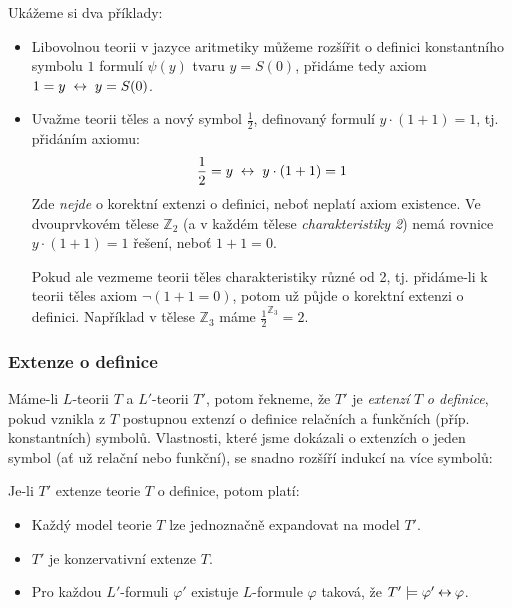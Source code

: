 \begin{example}
    Ukážeme si dva příklady:
    \begin{itemize}
        \item Libovolnou teorii v jazyce aritmetiky můžeme rozšířit o definici konstantního symbolu $1$ formulí $\psi(y)$ tvaru $y=S(0)$, přidáme tedy axiom $1=y\ \liff\ y=S(0)$.
        \item Uvažme teorii těles a nový symbol $\frac{1}{2}$, definovaný formulí $y\cdot (1+1)=1$, tj. přidáním axiomu: 
        $$
        \frac{1}{2}=y\ \liff\ y\cdot (1+1)=1
        $$
        Zde \emph{nejde} o korektní extenzi o definici, neboť neplatí axiom existence. Ve dvouprvkovém tělese $\mathbb Z_2$ (a v každém tělese \emph{charakteristiky 2}) nemá rovnice $y\cdot (1+1)=1$ řešení, neboť $1+1=0$.
        
        
        Pokud ale vezmeme teorii těles charakteristiky různé od 2, tj. přidáme-li k teorii těles axiom $\neg (1+1=0)$, potom už půjde o korektní extenzi o definici. Například v tělese $\mathbb Z_3$ máme $\frac{1}{2}^{\mathbb Z_3}=2$.
    \end{itemize}
\end{example}


\subsubsection*{Extenze o definice}

Máme-li $L$-teorii $T$ a $L'$-teorii $T'$, potom řekneme, že $T'$ je  \emph{extenzí} $T$ \emph{o definice}, pokud vznikla z $T$ postupnou extenzí o definice relačních a funkčních (příp. konstantních) symbolů. Vlastnosti, které jsme dokázali o extenzích o jeden symbol (ať už relační nebo funkční), se snadno rozšíří indukcí na více symbolů:

\begin{corollary}
   Je-li $T'$ extenze teorie $T$ o definice, potom platí:
   \begin{itemize}
    \item Každý model teorie $T$ lze jednoznačně expandovat na model $T'$.
    \item $T'$ je konzervativní extenze $T$.
    \item Pro každou $L'$-formuli $\varphi'$ existuje $L$-formule $\varphi$ taková, že $T'\models\varphi'\mathbin{\leftrightarrow}\varphi$.
   \end{itemize} 
\end{corollary}

